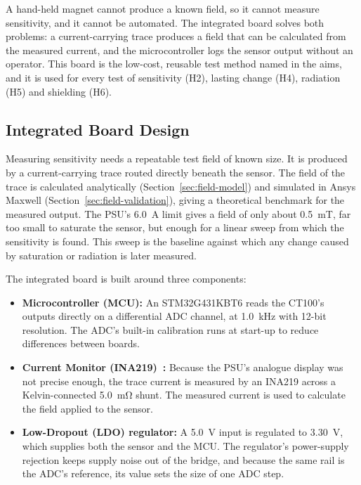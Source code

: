 \documentclass[12pt,a4paper]{article}
\begin{document}
A hand-held magnet cannot produce a known field, so it cannot measure sensitivity, and it cannot be automated. The integrated board solves both problems: a current-carrying trace produces a field that can be calculated from the measured current, and the microcontroller logs the sensor output without an operator. This board is the low-cost, reusable test method named in the aims, and it is used for every test of sensitivity (H2), lasting change (H4), radiation (H5) and shielding (H6).

\subsection{Integrated Board Design}
\label{sec:integrated-design}

Measuring sensitivity needs a repeatable test field of known size. It is produced by a current-carrying trace routed directly beneath the sensor. The field of the trace is calculated analytically (Section~\ref{sec:field-model}) and simulated in Ansys Maxwell (Section~\ref{sec:field-validation}), giving a theoretical benchmark for the measured output. The PSU's \SI{6.0}{\ampere} limit gives a field of only about \SI{0.5}{\milli\tesla}, far too small to saturate the sensor, but enough for a linear sweep from which the sensitivity is found. This sweep is the baseline against which any change caused by saturation or radiation is later measured.

The integrated board is built around three components:

\begin{itemize}
    \item \textbf{Microcontroller (MCU):} An STM32G431KBT6 \cite{stm32g4_rm} reads the CT100's outputs directly on a differential ADC channel, at \SI{1.0}{\kilo\hertz} with 12-bit resolution. The ADC's built-in calibration runs at start-up to reduce differences between boards.
    
    \item \textbf{Current Monitor (INA219)~\cite{ina219_datasheet}:} Because the PSU's analogue display was not precise enough, the trace current is measured by an INA219 across a Kelvin-connected \SI{5.0}{\milli\ohm} shunt. The measured current is used to calculate the field applied to the sensor.
    
    \item \textbf{Low-Dropout (LDO) regulator:} A \SI{5.0}{\volt} input is regulated to \SI{3.30}{\volt}, which supplies both the sensor and the MCU. The regulator's power-supply rejection keeps supply noise out of the bridge, and because the same rail is the ADC's reference, its value sets the size of one ADC step.
    
\end{itemize}
\end{document}

